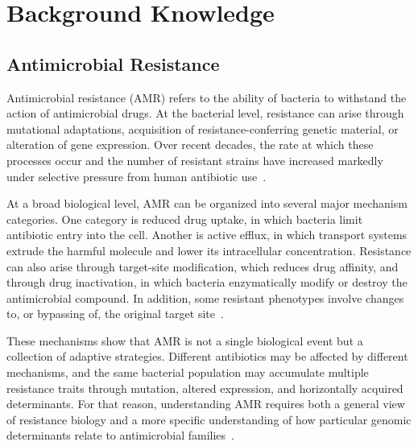 \chapter{Background Knowledge}

\section{Antimicrobial Resistance}

Antimicrobial resistance (AMR) refers to the ability of bacteria to withstand the action of antimicrobial drugs. At the bacterial level, resistance can arise through mutational adaptations, acquisition of resistance-conferring genetic material, or alteration of gene expression. Over recent decades, the rate at which these processes occur and the number of resistant strains have increased markedly under selective pressure from human antibiotic use~\citep{blair2014mechanisms,munita2016mechanisms,vonwintersdorff2016dissemination}.

At a broad biological level, AMR can be organized into several major mechanism categories. One category is reduced drug uptake, in which bacteria limit antibiotic entry into the cell. Another is active efflux, in which transport systems extrude the harmful molecule and lower its intracellular concentration. Resistance can also arise through target-site modification, which reduces drug affinity, and through drug inactivation, in which bacteria enzymatically modify or destroy the antimicrobial compound. In addition, some resistant phenotypes involve changes to, or bypassing of, the original target site~\citep{blair2014mechanisms,munita2016mechanisms}.

These mechanisms show that AMR is not a single biological event but a collection of adaptive strategies. Different antibiotics may be affected by different mechanisms, and the same bacterial population may accumulate multiple resistance traits through mutation, altered expression, and horizontally acquired determinants. For that reason, understanding AMR requires both a general view of resistance biology and a more specific understanding of how particular genomic determinants relate to antimicrobial families~\citep{blair2014mechanisms,munita2016mechanisms,vonwintersdorff2016dissemination}.


